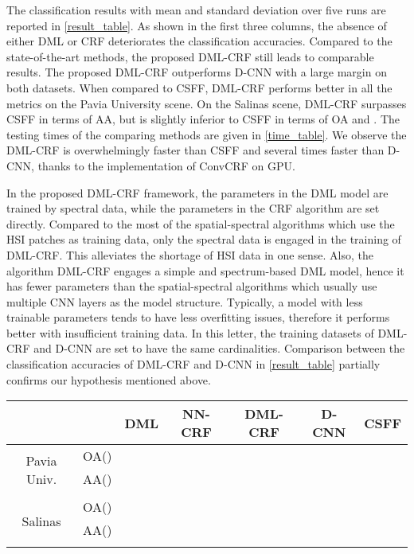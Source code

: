 \documentclass[]{article}
\newcommand{\red}{\color{black}}
\newcommand{\magentaso}{\color{black}}
\newcommand{\violetso}{\color{black}}
\begin{document}
The classification results with mean and standard deviation over five runs {\red are} reported in \cref{result_table}. As shown in the first three columns, the absence of either DML or CRF deteriorates the classification accuracies.
Compared to the state-of-the-art methods, the proposed DML-CRF still leads to comparable results.
{\red The proposed DML-CRF outperforms D-CNN with a large margin on both datasets.}
When compared to CSFF, DML-CRF performs better in all the metrics
on the Pavia University scene.
{\red
On the Salinas scene, DML-CRF {\red surpasses} CSFF in terms of AA, but is slightly inferior to CSFF in terms of OA and .}
The testing {\magentaso times of the comparing methods are} given in \cref{time_table}.
We observe the DML-CRF is overwhelmingly faster than CSFF and several times faster than  D-CNN, thanks to the implementation of ConvCRF on
GPU. 

{\violetso 
In the proposed DML-CRF framework, the parameters in the DML model are trained by spectral data, 
while the parameters in the CRF algorithm are set directly. 
Compared to the most of the spatial-spectral algorithms which use the HSI patches as training data, 
only the spectral data is engaged in the training of DML-CRF. This alleviates the shortage of 
HSI data in one sense. Also, the algorithm DML-CRF engages a simple and spectrum-based DML model, 
hence it has fewer parameters than the spatial-spectral algorithms which usually use 
multiple CNN layers as the model structure. 
Typically, a model with less trainable parameters 
tends to have less overfitting issues, therefore it performs better with insufficient training data. 
In this letter, the training datasets of DML-CRF and D-CNN are set to have the same 
cardinalities. 
Comparison between the classification accuracies of DML-CRF and D-CNN in \cref{result_table} 
partially confirms our hypothesis mentioned above.
}

\begin{table*}
	\centering
	\caption{\label{result_table}Classification accuracies (averaged over 5 runs)  of DML, NN-CRF,
		DML-CRF, D-CNN, and CSFF on Pavia University scene and Salinas scene}
	\begin{tabular}{c|c|c|c|c||c|c}
		\hline \hline
		\multicolumn{2}{c|}{}	& DML 	& NN-CRF 	& DML-CRF 	& D-CNN 	& CSFF \\ \hline
		\multirow{3}{*}{Pavia Univ.} 	& OA()       &  &  &  &    &      \\ \cline{3-7}
										& AA()       &  &  & &   &      \\ \cline{3-7}
										& 		& &  & &&      \\ \hline
		\multirow{3}{*}{Salinas}     	& OA()       &  &  & &   &      \\ \cline{3-7}
										& AA()       &  &  & &   &      \\ \cline{3-7}
										&  		& &        &         &&      \\ \hline \hline
	\end{tabular}
\end{table*}
\end{document}
